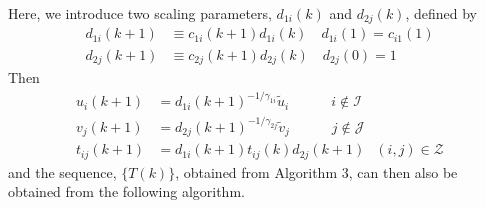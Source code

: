 \documentclass[twocolumn]{article}
\newtheorem{remark}{Remark}
\newcommand{\ignore}[1]{}
\begin{document}
\ignore{
\begin{remark}
Since 
\begin{align}
\label{eq:row*constraint}
    \Sigma_{j=1}^n t^*_{ij} =\tilde{u}_i,
\end{align}
 from  \eqref{eq:c_1Iterate},
$
\lim_{l\rightarrow \infty}c_{1i}(l) = 1,
$
  for all $i$.
  In Lemma \ref{lem:lem1b} (see Section~\ref{sec:propmin}), it will be shown that $t^*_{ij} >0$ for all $(i,j) \notin \mathcal{Z}$.
Hence, $T^*$ is guaranteed  not to contain any row of zeroes, and it follows from \eqref{eq:t_ijIterate} that
$
     \lim_{l\rightarrow \infty}c_{2j}(l) = 1,
$
  for all $j$.
  From \eqref{eq:c_2Iterate}, we see that
  \begin{align}
  \label{eq:col*constraint}
   \Sigma_{i=1}^m t^*_{ij}  = v^*_j,
  \end{align}
  and, since $T^*$ does not contain any column of zeroes, we must have
   $   v^*_j >0$,
   $\forall j$.
It now follows, from \eqref{eq:row*constraint} and \eqref{eq:col*constraint},
that
$
\sum_{j=1}^n v_j^* = \sum_{i=1}^m \tilde{u}_i
$
and so $v^*$ and $\tilde{u}$ are {\em balanced } (i.e. mass-conserving).  
The above result holds even in the {\em unbalanced} (i.e.\ non-mass-conserving) problem,
$
\sum_{i=1}^m \tilde{u}_i \neq \sum_{j=1}^n \tilde{v}_j
\label{eq:nonmc}
$.
{In this case, application of the SK algorithm
produces a
 sequence, $\{T(l)\}$, which  has two convergent subsequences with different limits \cite{BaradatAl2022}.}
\end{remark}
}


Here, we introduce two scaling parameters,
 $d_{1i}(k)$ and $d_{2j}(k)$, defined by
\begin{align}
d_{1i}(k+1) &\equiv c_{1i}(k+1)d_{1i}(k) \quad d_{1i}(1) = c_{i1}(1)	\\
d_{2j}(k+1) &\equiv c_{2j}(k+1)d_{2j}(k) \quad d_{2j}(0) = 1
\end{align}
Then
\begin{align}
   u_{i}(k+1) &= d_{1i}(k+1)^{-1/\gamma_{1i}} \tilde{u}_i  \quad\qquad i \notin \mathcal{I}	\\
  v_{j}(k+1) &= d_{2j}(k+1)^{-1/\gamma_{2j}} \tilde{v}_j 	\quad \qquad  j \notin \mathcal{J}	
    \label{eq:v_jIterate2}\\
    t_{ij}(k+1)   &= d_{1i}(k+1)t_{ij}(k)d_{2j}(k+1)	\;\; \,(i,j) \in \mathcal{Z}
 \label{eq:t_ijIterate2} 
\end{align}
and the sequence, $\{T(k)\}$, obtained from Algorithm 3, can then also be obtained from the following algorithm.\\
\end{document}
